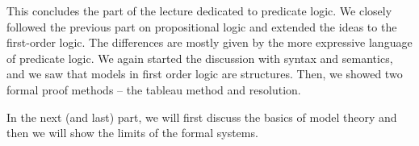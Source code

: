 \bigskip

This concludes the part of the lecture dedicated to predicate logic. We closely followed the previous part on propositional logic and extended the ideas to the first-order logic. The differences are mostly given by the more expressive language of predicate logic. We again started the discussion with syntax and semantics, and we saw that models in first order logic are structures. Then, we showed two formal proof methods -- the tableau method and resolution. 

In the next (and last) part, we will first discuss the basics of model theory and then we will show the limits of the formal systems.
